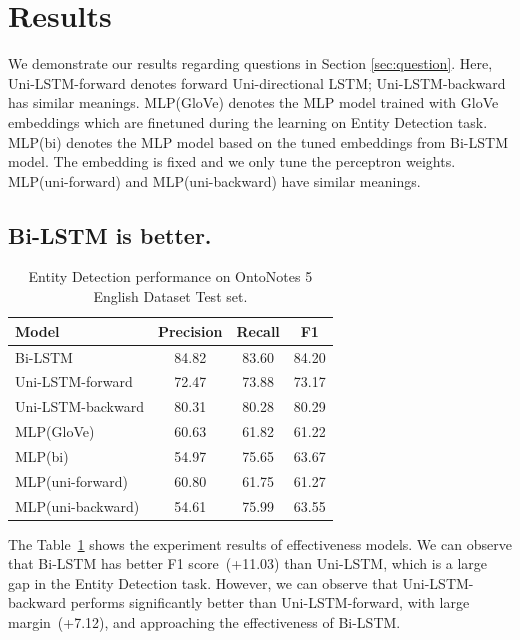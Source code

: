 \documentclass{article}
\begin{document}
\section{Results}

We demonstrate our results regarding questions in Section \ref{sec:question}. Here, Uni-LSTM-forward denotes forward Uni-directional LSTM; Uni-LSTM-backward has similar meanings. MLP(GloVe) denotes the MLP model trained with GloVe embeddings which are finetuned during the learning on Entity Detection task. MLP(bi) denotes the MLP model based on the tuned embeddings from Bi-LSTM model. The embedding is fixed and we only tune the perceptron weights. MLP(uni-forward) and MLP(uni-backward) have similar meanings.

\subsection{Bi-LSTM is better.}

\begin{table}[t]
	\centering
	\begin{tabular}{l@{\qquad}ccc}
		\toprule
		\textbf{Model}         & \textbf{Precision} & \textbf{Recall} & \textbf{F1} \\ \midrule
		Bi-LSTM &  84.82 & 83.60  & 84.20 \\
		Uni-LSTM-forward & 72.47 & 73.88 & 73.17 \\
		Uni-LSTM-backward & 80.31 & 80.28 & 80.29 \\ \midrule
		MLP(GloVe) & 60.63 & 61.82 & 61.22 \\
		MLP(bi) & 54.97 & 75.65 & 63.67 \\ 
		MLP(uni-forward) & 60.80 & 61.75 &  61.27 \\ 
		MLP(uni-backward) & 54.61 & 75.99 & 63.55 \\ 
		\bottomrule
	\end{tabular}
	\vspace{3mm}
	\caption{Entity Detection performance on OntoNotes 5 English Dataset Test set. }
	\label{res:ner}
\end{table}

The Table~\ref{res:ner} shows the experiment results of effectiveness models. 
We can observe that Bi-LSTM has better F1 score~(+11.03) than Uni-LSTM, which is a large gap in the Entity Detection task. However, we can observe that Uni-LSTM-backward performs significantly better than Uni-LSTM-forward, with large margin~(+7.12), and approaching the effectiveness of Bi-LSTM.
\end{document}
